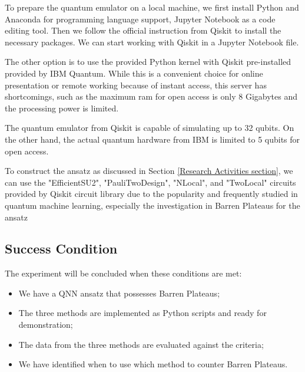 To prepare the quantum emulator on a local machine, we first install Python and Anaconda for programming language support, Jupyter Notebook as a code editing tool.
Then we follow the official instruction from Qiskit \cite{Qiskit} to install the necessary packages.
We can start working with Qiskit in a Jupyter Notebook file.

The other option is to use the provided Python kernel with Qiskit pre-installed provided by IBM Quantum. 
While this is a convenient choice for online presentation or remote working because of instant access, this server has shortcomings, such as the maximum ram for open access is only 8 Gigabytes and the processing power is limited.

The quantum emulator from Qiskit is capable of simulating up to 32 qubits. On the other hand, the actual quantum hardware from IBM is limited to 5 qubits for open access.

To construct the ansatz as discussed in Section \ref{Research Activities section}, we can use the "EfficientSU2", "PauliTwoDesign", "NLocal", and "TwoLocal" circuits provided by Qiskit circuit library due to the popularity and frequently studied in quantum machine learning, especially the investigation in Barren Plateaus for the ansatz


\subsection{Success Condition}
The experiment will be concluded when these conditions are met:
\begin{itemize}
    \item We have a QNN ansatz that possesses Barren Plateaus;
    \item The three methods are implemented as Python scripts and ready for demonstration;
    \item The data from the three methods are evaluated against the criteria;
    \item We have identified when to use which method to counter Barren Plateaus.
\end{itemize}